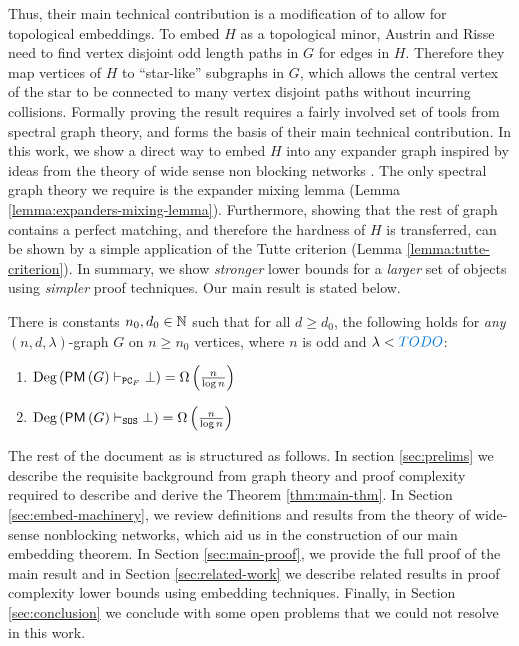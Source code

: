 \documentclass[11pt]{article}
\begin{document}
Thus, their main technical contribution is a modification of \citet{krivelevich2019completeminorsgraphssparse} to allow for topological embeddings.
To embed $H$ as a topological minor, Austrin and Risse need to find vertex disjoint odd length paths in $G$ for edges in $H$.
Therefore they map vertices of $H$ to ``star-like'' subgraphs in $G$, which allows the central vertex of the star to be connected to many vertex disjoint paths without incurring collisions.
Formally proving the result requires a fairly involved set of tools from spectral graph theory, and forms the basis of their main technical contribution.
In this work, we show a direct way to embed $H$ into any expander graph inspired by ideas from the theory of wide sense non blocking networks \citep{feldman1988wide}.
The only spectral graph theory we require is the expander mixing lemma (Lemma \ref{lemma:expanders-mixing-lemma}).
Furthermore, showing that the rest of graph contains a perfect matching, and therefore the hardness of $H$ is transferred, can be shown by a simple application of the Tutte criterion (Lemma \ref{lemma:tutte-criterion}).
In summary, we show \emph{stronger} lower bounds for a \emph{larger} set of objects using \emph{simpler} proof techniques.
Our main result is stated below.

\begin{theorem}\label{thm:main-thm}

There is constants $n_0, d_0 \in \mathbb{N}$ such that for all $d \geq d_0$, the following holds  for \emph{any} $(n, d, \lambda)$-graph $G$ on $n \geq n_0$ vertices, where $n$ is odd and $\lambda < \highlight{TODO}$:
\begin{enumerate}
    \item{ $\text{Deg}\left(\mathsf{PM}\left(G\right) \vdash_{\texttt{PC}_F} \bot\right) = \Omega\left(\frac{n}{\log n}\right)$} 
    \item{$\text{Deg}\left(\mathsf{PM}\left(G\right) \vdash_{\texttt{SOS}} \bot\right) = \Omega\left(\frac{n}{\log n}\right)$}
\end{enumerate}

\end{theorem}

The rest of the document as is structured as follows. In section \ref{sec:prelims} we describe the requisite background from graph theory and proof complexity required to describe and derive the Theorem \ref{thm:main-thm}.
In Section \ref{sec:embed-machinery}, we review definitions and results from the theory of wide-sense nonblocking networks, which aid us in the construction of our main embedding theorem.
In Section \ref{sec:main-proof}, we provide the full proof of the main result and in Section \ref{sec:related-work} we describe related results in proof complexity lower bounds using embedding techniques.
Finally, in Section \ref{sec:conclusion} we conclude with some open problems that we could not resolve in this work.
\end{document}
